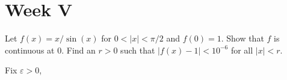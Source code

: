 \documentclass[../../main.tex]{subfiles}
\begin{document}
    \section{Week V}

    \begin{problem}[\S5.1 B]
        Let $f(x) = x/\sin(x)$ for $0 < |x| < \pi/2$ and $f(0) = 1$.
        Show that $f$ is continuous at $0$.
        Find an $r > 0$ such that $|f(x) - 1| < 10^{-6}$ for all $|x| < r$.
    \end{problem}
    Fix $\varepsilon > 0$,
\end{document}
